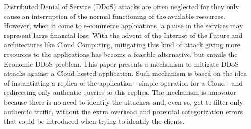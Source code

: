 
Distributed Denial of Service (DDoS) attacks are often neglected for they only cause an interruption of the normal functioning of the available resources. However, when it come to e-commerce applications, a pause in the services may represent large financial loss. With the advent of the Internet of the Future and architectures like Cloud Computing, mitigating this kind of attack giving more resources to the applications has become a feasible alternative, but entails the Economic DDoS problem. This paper presents a mechanism to mitigate DDoS attacks against a Cloud hosted application. Such mechanism is based on the idea of instantiating a replica of the application - simple operation for a Cloud - and redirecting only authentic queries to this replica. The mechanism is innovator because there is no need to identify the attackers and, even so, get to filter only authentic traffic, without the extra overhead and potential categorization errors that could be introduced when trying to identify the clients.